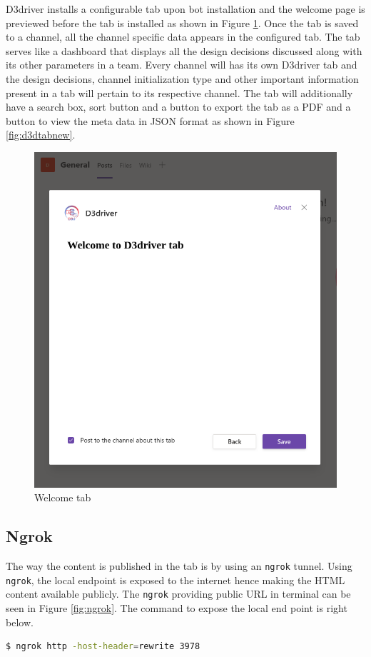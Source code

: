 D3driver installs a configurable tab upon bot installation and the welcome page is previewed before the tab is installed as shown in Figure \ref{fig:welcomepageintab}. Once the tab is saved to a channel, all the channel specific data appears in the configured tab. The tab serves like a dashboard that displays all the design decisions discussed along with its other parameters in a team. Every channel will has its own D3driver tab and the design decisions, channel initialization type and other important information present in a tab will pertain to its respective channel. The tab will additionally have a search box, sort button and a button to export the tab as a PDF and a button to view the meta data in JSON format as shown in Figure \ref{fig:d3dtabnew}. 

\begin{figure}[h]
\centering
\includegraphics[width=0.6\linewidth]{figures/welcomepageintab}
\captionsetup{justification=centering}
\caption{Welcome tab}
\label{fig:welcomepageintab}
\end{figure}

\subsection{Ngrok}

The way the content is published in the tab is by using an \texttt{ngrok} tunnel. Using \texttt{ngrok}, the local endpoint is exposed to the internet hence making the HTML content available publicly. The \texttt{ngrok} providing public URL in terminal can be seen in Figure \ref{fig:ngrok}. The command to expose the local end point is right below. 

\begin{lstlisting}[language=bash]
  $ ngrok http -host-header=rewrite 3978
\end{lstlisting}

